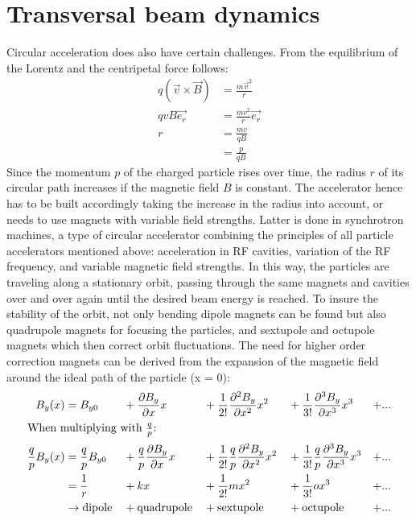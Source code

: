 \section{Transversal beam dynamics}
\label{AccPhysics:Magnets}

Circular acceleration does also have certain challenges.
From the equilibrium of the Lorentz and the centripetal force follows:
\begin{align}
q(\vec{v}\times \vec{B}) &= \frac{m\vec{v}^2}{r}\\
qvB\vec{e_r} &= \frac{mv^2}{r}\vec{e_r} \nonumber \\
 r&=\frac{mv}{qB}\\
 &=\frac{p}{qB}\label{eq:MagField_Radius}
\end{align}
Since the momentum $p$ of the charged particle rises over time, the radius $r$ of its circular path increases if the magnetic field $B$ is constant.
The accelerator hence has to be built accordingly taking the increase in the radius into account, or needs to use magnets with variable field strengths.
Latter is done in synchrotron machines, a type of circular accelerator combining the principles of all particle accelerators mentioned above: acceleration in RF cavities, variation of the RF frequency, and variable magnetic field strengths.
In this way, the particles are traveling along a stationary orbit, passing through the same magnets and cavities over and over again until the desired beam energy is reached.
To insure the stability of the orbit, not only bending dipole magnets can be found but also quadrupole magnets for focusing the particles, and sextupole and octupole magnets which then correct orbit fluctuations.
The need for higher order correction magnets can be derived from the expansion of the magnetic field around the ideal path of the particle (x = 0):
\begin{alignat}{5}
 B_y(x) &= B_{y0} &&+ \frac{\partial B_y}{\partial x}x &&+ \frac{1}{2!}\frac{\partial^2 B_y}{\partial x^2}x^2 &&+ \frac{1}{3!}\frac{\partial^3 B_y}{\partial x^3}x^3 &+ ...\\
 \intertext{When multiplying with $\frac{q}{p}$:}
 \frac{q}{p}B_y(x) &= \frac{q}{p}B_{y0} &&+ \frac{q}{p}\frac{\partial B_y}{\partial x}x &&+  \frac{1}{2!}\frac{q}{p}\frac{\partial^2 B_y}{\partial x^2}x^2 &&+ \frac{1}{3!}\frac{q}{p}\frac{\partial^3 B_y}{\partial x^3}x^3 &+ ...\\
  &= \frac{1}{r} &&+ kx &&+ \frac{1}{2!}mx^2 &&+ \frac{1}{3!}ox^3 &+ ... \label{eq:field_components}\\
  &\rightarrow \textnormal{dipole} &&+ \textnormal{quadrupole} &&+ \textnormal{sextupole} &&+ \textnormal{octupole} &+ ...\nonumber
\end{alignat}
